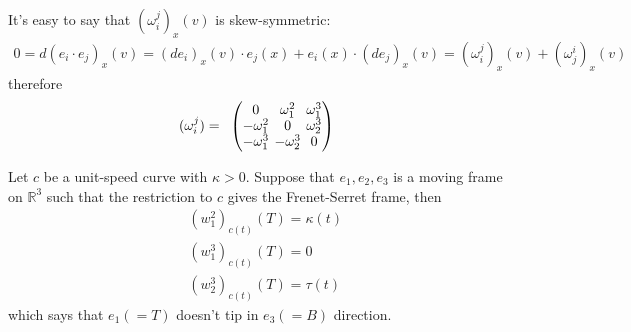\documentclass[10pt]{article}
\begin{document}
		It's easy to say that $(\omega_i^j)_x(v)$ is skew-symmetric:
		\begin{equation*}
			\begin{aligned}
				0 = d(e_i\cdot e_j)_x(v) = (de_i)_x(v)\cdot e_j(x) + e_i(x)\cdot(de_j)_x(v) = (\omega_i^j)_x(v) + (\omega_j^i)_x(v)
			\end{aligned}
		\end{equation*}
		therefore
		\begin{equation*}
			\begin{aligned}
				(\omega_i^j) = 
                \begin{array}{lc}
                    \setlength{\arraycolsep}{2pt}
                    \begingroup
                    \renewcommand*{\arraystretch}{0.89}
                    \begin{pmatrix}
                        0 & \omega_1^2 & \omega_1^3 \\
                        -\omega_1^2 & 0 & \omega_2^3 \\
                        -\omega_1^3 & -\omega_2^3 & 0 \\
                    \end{pmatrix}
                    \endgroup
                \end{array}
			\end{aligned}
		\end{equation*}
	
		\begin{remark}
			Let $c$ be a unit-speed curve with $\kappa> 0$. Suppose that $e_1, e_2, e_3$ is a moving frame on $\mathbb{R}^3$ such that the restriction to $c$ gives the Frenet-Serret frame, then
			\begin{equation*}
				\begin{aligned}
					&(w_1^2)_{c(t)}(T) = \kappa(t) \\
					&(w_1^3)_{c(t)}(T) = 0 \\
					&(w_2^3)_{c(t)}(T) = \tau(t)
				\end{aligned}
			\end{equation*}
			which says that $e_1(=T)$ doesn't tip in $e_3(=B)$ direction.
		\end{remark}
	
\end{document}
